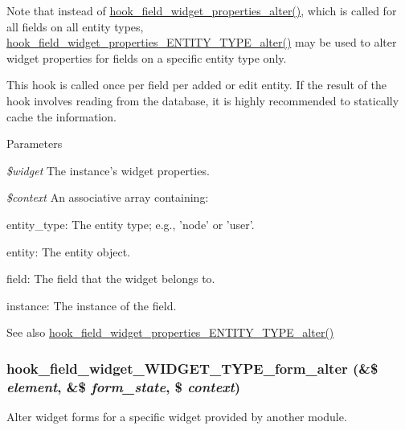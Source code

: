 Note that instead of \hyperlink{group__field__widget_gaa88988bce1ffbec1f481ec7a3ba87e51}{hook\_\-field\_\-widget\_\-properties\_\-alter()}, which is called for all fields on all entity types, \hyperlink{group__field__storage_gafbf6029d00ade9df41649d247531f3ba}{hook\_\-field\_\-widget\_\-properties\_\-ENTITY\_\-TYPE\_\-alter()} may be used to alter widget properties for fields on a specific entity type only.

This hook is called once per field per added or edit entity. If the result of the hook involves reading from the database, it is highly recommended to statically cache the information.


\begin{DoxyParams}{Parameters}
\item[{\em \$widget}]The instance's widget properties. \item[{\em \$context}]An associative array containing:
\begin{DoxyItemize}
\item entity\_\-type: The entity type; e.g., 'node' or 'user'.
\item entity: The entity object.
\item field: The field that the widget belongs to.
\item instance: The instance of the field.
\end{DoxyItemize}\end{DoxyParams}
\begin{DoxySeeAlso}{See also}
\hyperlink{group__field__storage_gafbf6029d00ade9df41649d247531f3ba}{hook\_\-field\_\-widget\_\-properties\_\-ENTITY\_\-TYPE\_\-alter()} 
\end{DoxySeeAlso}
\hypertarget{group__field__widget_ga6f53f1874a16e18c27dcc0cc4e7c1ec6}{
\subsubsection[{hook\_\-field\_\-widget\_\-WIDGET\_\-TYPE\_\-form\_\-alter}]{\setlength{\rightskip}{0pt plus 5cm}hook\_\-field\_\-widget\_\-WIDGET\_\-TYPE\_\-form\_\-alter (\&\$ {\em element}, \/  \&\$ {\em form\_\-state}, \/  \$ {\em context})}}
\label{group__field__widget_ga6f53f1874a16e18c27dcc0cc4e7c1ec6}
Alter widget forms for a specific widget provided by another module.


